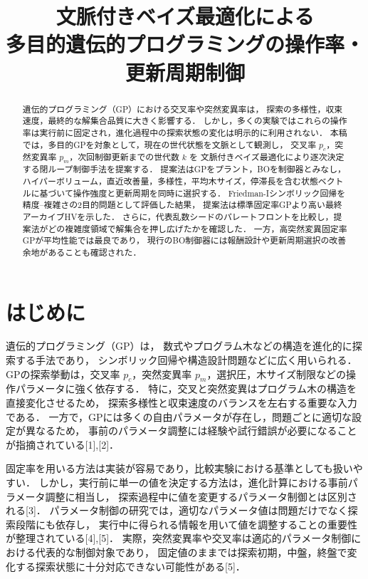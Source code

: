 \documentclass[a4paper,10pt,twocolumn]{ltjsarticle}
\title{文脈付きベイズ最適化による\\多目的遺伝的プログラミングの操作率・更新周期制御}
\author{}
\date{}
\begin{document}
\maketitle

\begin{abstract}
遺伝的プログラミング（GP）における交叉率や突然変異率は，
探索の多様性，収束速度，最終的な解集合品質に大きく影響する．
しかし，多くの実験ではこれらの操作率は実行前に固定され，進化過程中の探索状態の変化は明示的に利用されない．
本稿では，多目的GPを対象として，現在の世代状態を文脈として観測し，
交叉率 \(p_c\)，突然変異率 \(p_m\)，次回制御更新までの世代数 \(k\) を
文脈付きベイズ最適化により逐次決定する閉ループ制御手法を提案する．
提案法はGPをプラント，BOを制御器とみなし，
ハイパーボリューム，直近改善量，多様性，平均木サイズ，停滞長を含む状態ベクトルに基づいて操作強度と更新周期を同時に選択する．
Friedman-Iシンボリック回帰を精度--複雑さの2目的問題として評価した結果，
提案法は標準固定率GPより高い最終アーカイブHVを示した．
さらに，代表乱数シードのパレートフロントを比較し，提案法がどの複雑度領域で解集合を押し広げたかを確認した．
一方，高突然変異固定率GPが平均性能では最良であり，
現行のBO制御器には報酬設計や更新周期選択の改善余地があることも確認された．
\end{abstract}

\section{はじめに}

遺伝的プログラミング（GP）は，
数式やプログラム木などの構造を進化的に探索する手法であり，
シンボリック回帰や構造設計問題などに広く用いられる．
GPの探索挙動は，交叉率 \(p_c\)，突然変異率 \(p_m\)，選択圧，木サイズ制限などの操作パラメータに強く依存する．
特に，交叉と突然変異はプログラム木の構造を直接変化させるため，
探索多様性と収束速度のバランスを左右する重要な入力である．
一方で，GPには多くの自由パラメータが存在し，問題ごとに適切な設定が異なるため，
事前のパラメータ調整には経験や試行錯誤が必要になることが指摘されている[1],[2]．

固定率を用いる方法は実装が容易であり，比較実験における基準としても扱いやすい．
しかし，実行前に単一の値を決定する方法は，進化計算における事前パラメータ調整に相当し，
探索過程中に値を変更するパラメータ制御とは区別される[3]．
パラメータ制御の研究では，適切なパラメータ値は問題だけでなく探索段階にも依存し，
実行中に得られる情報を用いて値を調整することの重要性が整理されている[4],[5]．
実際，突然変異率や交叉率は適応的パラメータ制御における代表的な制御対象であり，
固定値のままでは探索初期，中盤，終盤で変化する探索状態に十分対応できない可能性がある[5]．
\end{document}

